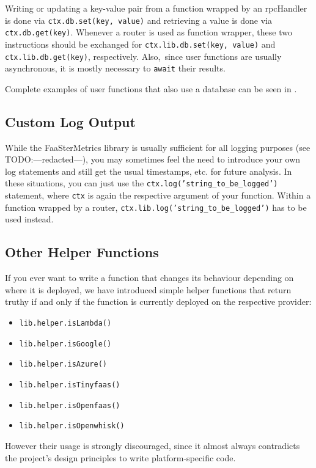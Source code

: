 \documentclass[../main.tex]{subfiles}
\begin{document}
Writing or updating a key-value pair from a function wrapped by an rpcHandler is done via \texttt{ctx.db.set(key, value)}
and retrieving a value is done via \texttt{ctx.db.get(key)}.
Whenever a router is used as function wrapper, these two instructions should be exchanged for
\texttt{ctx.lib.db.set(key, value)} and \texttt{ctx.lib.db.get(key)}, respectively.
Also,~since user functions are usually asynchronous, it is mostly necessary to \texttt{await} their results.

Complete examples of user functions that also use a database can be seen in 
.

\subsection{Custom Log Output}\label{sub:functionCustomLogs}

While the FaaSterMetrics library is usually sufficient for all logging purposes (see TODO:\@ ---redacted---),
you may sometimes feel the need to introduce your own log statements and still get the usual timestamps, etc.\@
for future analysis.
In these situations, you can just use the \texttt{ctx.log('string_to_be_logged')} statement,
where \texttt{ctx} is again the respective argument of your function.
Within a function wrapped by a router, \texttt{ctx.lib.log('string_to_be_logged')} has to be used instead.

\subsection{Other Helper Functions}\label{sub:helperFunctions}

If you ever want to write a function that changes its behaviour depending on where it is deployed,
we have introduced simple helper functions that return truthy if and only if 
the function is currently deployed on the respective provider:
\begin{itemize}
  \item \texttt{lib.helper.isLambda()}
  \item \texttt{lib.helper.isGoogle()}
  \item \texttt{lib.helper.isAzure()}
  \item \texttt{lib.helper.isTinyfaas()}
  \item \texttt{lib.helper.isOpenfaas()}
  \item \texttt{lib.helper.isOpenwhisk()}
\end{itemize}
However their usage is strongly discouraged, 
since it almost always contradicts the project's design principles to write platform-specific code.
\end{document}
